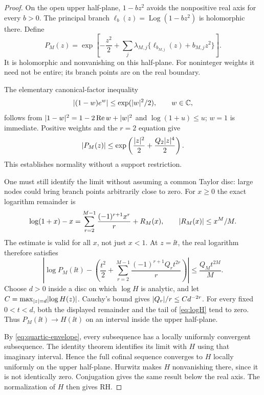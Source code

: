 \begin{proof}
On the open upper half-plane, $1-bz^2$ avoids the nonpositive real axis for every $b>0$. The principal branch $\ell_b(z)=\operatorname{Log}(1-bz^2)$ is holomorphic there. Define
\[
 P_M(z)=\exp\left[-\frac{z^2}{2}
       +\sum_j\lambda_{M,j}\{\ell_{b_{M,j}}(z)+b_{M,j}z^2\}\right].
\]
It is holomorphic and nonvanishing on this half-plane. For noninteger weights it need not be entire; its branch points are on the real boundary.

The elementary canonical-factor inequality
\begin{equation}\label{eq:canonical-inequality}
 \lvert(1-w)e^w\rvert\le\exp(\lvert w\rvert^2/2),\qquad w\in\mathbb C,
\end{equation}
follows from $\lvert1-w\rvert^2=1-2\operatorname{Re} w+\lvert w\rvert^2$ and $\log(1+u)\le u$; $w=1$ is immediate. Positive weights and the $r=2$ equation give
\begin{equation}\label{eq:quartic-envelope}
 \lvert P_M(z)\rvert\le\exp\left(\frac{\lvert z\rvert^2}{2}
                              +\frac{Q_2\lvert z\rvert^4}{2}\right).
\end{equation}
This establishes normality without a support restriction.

One must still identify the limit without assuming a common Taylor disc: large nodes could bring branch points arbitrarily close to zero. For $x\ge0$ the exact logarithm remainder is
\[
 \log(1+x)-x=\sum_{r=2}^{M-1}\frac{(-1)^{r+1}x^r}{r}+R_M(x),
 \qquad \lvert R_M(x)\rvert\le x^M/M.
\]
The estimate is valid for all $x$, not just $x<1$. At $z=\ii t$, the real logarithm therefore satisfies
\[
 \left|\log P_M(\ii t)-\left(
 \frac{t^2}{2}+\sum_{r=2}^{M-1}\frac{(-1)^{r+1}Q_rt^{2r}}r\right)\right|
 \le\frac{Q_Mt^{2M}}M.
\]
Choose $d>0$ inside a disc on which $\log H$ is analytic, and let $C=\max_{\lvert z\rvert=d}\lvert\log H(z)\rvert$. Cauchy's bound gives $\lvert Q_r\rvert/r\le Cd^{-2r}$. For every fixed $0<t<d$, both the displayed remainder and the tail of \eqref{eq:logH} tend to zero. Thus $P_M(\ii t)\to H(\ii t)$ on an interval inside the upper half-plane.

By \eqref{eq:quartic-envelope}, every subsequence has a locally uniformly convergent subsequence. The identity theorem identifies its limit with $H$ using that imaginary interval. Hence the full cofinal sequence converges to $H$ locally uniformly on the upper half-plane. Hurwitz makes $H$ nonvanishing there, since it is not identically zero. Conjugation gives the same result below the real axis. The normalization of $H$ then gives RH.
\end{proof}

